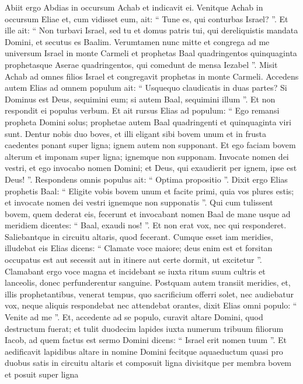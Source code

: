 \begin{biblechapter}
\begin{biblechapter}
\begin{biblechapter}
\begin{biblechapter}
\begin{biblechapter}
\begin{biblechapter}
\begin{biblechapter}
\begin{biblechapter}
\begin{biblechapter}
\begin{biblechapter}
\begin{biblechapter}
\begin{biblechapter}
\begin{biblechapter}
\begin{biblechapter}
\begin{biblechapter}
\begin{biblechapter}
\begin{biblechapter}
\begin{biblechapter}
 \verse Abiit ergo Abdias in occursum Achab et indicavit ei.
 Venitque Achab in occursum Eliae 
\verse et, cum vidisset eum, ait: “ Tune es, qui conturbas Israel? ”. 
\verse Et ille ait: “ Non turbavi Israel, sed tu et domus patris tui, qui dereliquistis mandata Domini, et secutus es Baalim. 
\verse Verumtamen nunc mitte et congrega ad me universum Israel in monte Carmeli et prophetas Baal quadringentos quinquaginta prophetasque Aserae quadringentos, qui comedunt de mensa Iezabel ”.
 \verse Misit Achab ad omnes filios Israel et congregavit prophetas in monte Carmeli. 
\verse Accedens autem Elias ad omnem populum ait: “ Usquequo claudicatis in duas partes? Si Dominus est Deus, sequimini eum; si autem Baal, sequimini illum ”. Et non respondit ei populus verbum. 
\verse Et ait rursus Elias ad populum: “ Ego remansi propheta Domini solus; prophetae autem Baal quadringenti et quinquaginta viri sunt. 
\verse Dentur nobis duo boves, et illi eligant sibi bovem unum et in frusta caedentes ponant super ligna; ignem autem non supponant. Et ego faciam bovem alterum et imponam super ligna; ignemque non supponam. 
\verse Invocate nomen dei vestri, et ego invocabo nomen Domini; et Deus, qui exaudierit per ignem, ipse est Deus! ”. Respondens omnis populus ait: “ Optima propositio ”.
 \verse Dixit ergo Elias prophetis Baal: “ Eligite vobis bovem unum et facite primi, quia vos plures estis; et invocate nomen dei vestri ignemque non supponatis ”. 
 \verse Qui cum tulissent bovem, quem dederat eis, fecerunt et invocabant nomen Baal de mane usque ad meridiem dicentes: “ Baal, exaudi nos! ”. Et non erat vox, nec qui responderet. Saliebantque in circuitu altaris, quod fecerant. 
\verse Cumque esset iam meridies, illudebat eis Elias dicens: “ Clamate voce maiore; deus enim est et forsitan occupatus est aut secessit aut in itinere aut certe dormit, ut excitetur ”. 
\verse Clamabant ergo voce magna et incidebant se iuxta ritum suum cultris et lanceolis, donec perfunderentur sanguine.
 \verse Postquam autem transiit meridies, et, illis prophetantibus, venerat tempus, quo sacrificium offerri solet, nec audiebatur vox, neque aliquis respondebat nec attendebat orantes, 
\verse dixit Elias omni populo: “ Venite ad me ”. Et, accedente ad se populo, curavit altare Domini, quod destructum fuerat; 
\verse et tulit duodecim lapides iuxta numerum tribuum filiorum Iacob, ad quem factus est sermo Domini dicens: “ Israel erit nomen tuum ”. 
\verse Et aedificavit lapidibus altare in nomine Domini fecitque aquaeductum quasi pro duobus satis in circuitu altaris 
\verse et composuit ligna divisitque per membra bovem et posuit super ligna 

\end{biblechapter}
\end{biblechapter}
\end{biblechapter}
\end{biblechapter}
\end{biblechapter}
\end{biblechapter}
\end{biblechapter}
\end{biblechapter}
\end{biblechapter}
\end{biblechapter}
\end{biblechapter}
\end{biblechapter}
\end{biblechapter}
\end{biblechapter}
\end{biblechapter}
\end{biblechapter}
\end{biblechapter}
\end{biblechapter}
